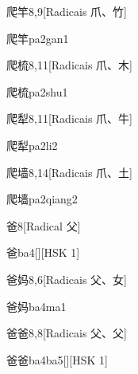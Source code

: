 \begin{entry}{爬竿}{8,9}[Radicais ⽖、⽵]
  \begin{phonetics}{爬竿}{pa2gan1}
  \end{phonetics}
\end{entry}

\begin{entry}{爬梳}{8,11}[Radicais ⽖、⽊]
  \begin{phonetics}{爬梳}{pa2shu1}
  \end{phonetics}
\end{entry}

\begin{entry}{爬犁}{8,11}[Radicais ⽖、⽜]
  \begin{phonetics}{爬犁}{pa2li2}
  \end{phonetics}
\end{entry}

\begin{entry}{爬墙}{8,14}[Radicais ⽖、⼟]
  \begin{phonetics}{爬墙}{pa2qiang2}
  \end{phonetics}
\end{entry}

\begin{entry}{爸}{8}[Radical ⽗]
  \begin{phonetics}{爸}{ba4}[][HSK 1]
  \end{phonetics}
\end{entry}

\begin{entry}{爸妈}{8,6}[Radicais ⽗、⼥]
  \begin{phonetics}{爸妈}{ba4ma1}
  \end{phonetics}
\end{entry}

\begin{entry}{爸爸}{8,8}[Radicais ⽗、⽗]
  \begin{phonetics}{爸爸}{ba4ba5}[][HSK 1]
  \end{phonetics}
\end{entry}

